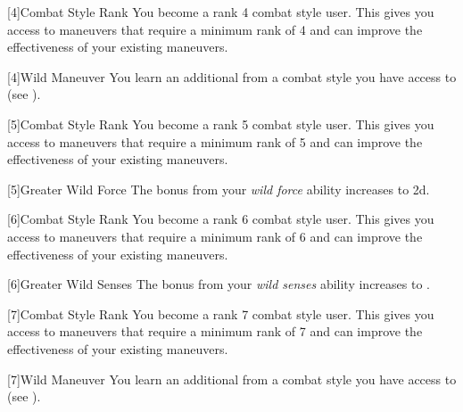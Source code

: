         {
            [4]{Combat Style Rank} You become a rank 4 combat style user.
            This gives you access to maneuvers that require a minimum rank of 4 and can improve the effectiveness of your existing maneuvers.

            [4]{Wild Maneuver}
            You learn an additional  from a combat style you have access to (see ).
        }

        {
            [5]{Combat Style Rank} You become a rank 5 combat style user.
            This gives you access to maneuvers that require a minimum rank of 5 and can improve the effectiveness of your existing maneuvers.

            [5]{Greater Wild Force} The bonus from your \textit{wild force} ability increases to \plus2d.
        }

        {
            [6]{Combat Style Rank} You become a rank 6 combat style user.
            This gives you access to maneuvers that require a minimum rank of 6 and can improve the effectiveness of your existing maneuvers.

            [6]{Greater Wild Senses} The bonus from your \textit{wild senses} ability increases to .
        }

        {
            [7]{Combat Style Rank} You become a rank 7 combat style user.
            This gives you access to maneuvers that require a minimum rank of 7 and can improve the effectiveness of your existing maneuvers.

            [7]{Wild Maneuver}
            You learn an additional  from a combat style you have access to (see ).
        }

\newpage
